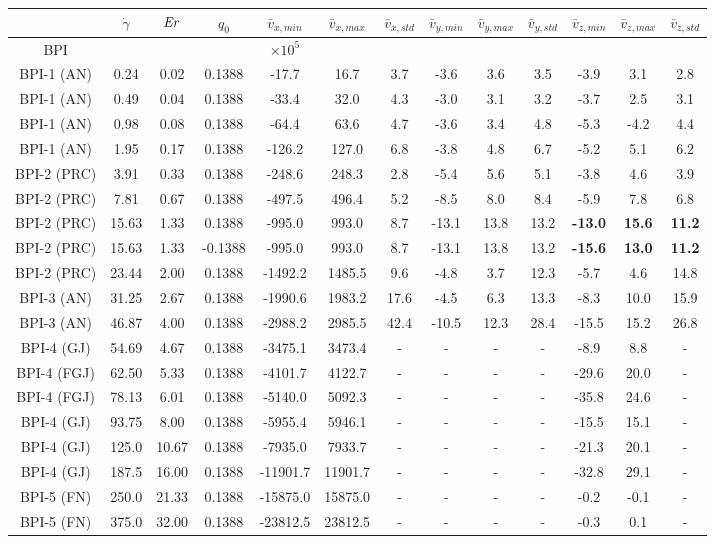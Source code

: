 \documentclass[8.5pt,twoside,twocolumn]{article}
\begin{document}
\begin{table}[htpb]
\begin{tabular}{|c||c|| c || c || c |c |c||c| c| c||c| c| c|}
\hline
& $\dot{\gamma}$ & ${\it Er}$ & $q_0$ & $\bar{v}_{x,min}$ & $\bar{v}_{x,max}$ & $\bar{v}_{x,std}$ & $\bar{v}_{y,min}$ & $\bar{v}_{y,max}$ & $\bar{v}_{y,std}$ & $\bar{v}_{z,min}$ & $\bar{v}_{z,max}$ & $\bar{v}_{z,std}$ \\
\hline
BPI & & & & $\times 10^5$\\
\hline
BPI-1 (AN) &0.24 &0.02 & 0.1388 &-17.7 &16.7 &3.7 &-3.6 &3.6 &3.5 &-3.9 &3.1 &2.8 \\
BPI-1 (AN) &0.49 &0.04 & 0.1388 &-33.4 &32.0 &4.3 &-3.0 &3.1 &3.2 &-3.7 &2.5 &3.1 \\
BPI-1 (AN) &0.98 &0.08 & 0.1388 &-64.4 &63.6 &4.7 &-3.6 &3.4 &4.8 &-5.3 &-4.2 &4.4 \\
BPI-1 (AN) &1.95 &0.17 & 0.1388 &-126.2 &127.0 &6.8 &-3.8 &4.8 &6.7 &-5.2 &5.1 &6.2 \\
\hline
BPI-2 (PRC) &3.91 &0.33 & 0.1388 &-248.6 &248.3 &2.8 &-5.4 &5.6 &5.1 &-3.8 &4.6 &3.9 \\
BPI-2 (PRC) &7.81 &0.67 & 0.1388 &-497.5 &496.4 &5.2 &-8.5 &8.0 &8.4 &-5.9 &7.8 &6.8 \\
BPI-2 (PRC) &15.63 &1.33 & 0.1388 &-995.0 &993.0 &8.7 &-13.1 &13.8 &13.2 &\bf{-13.0} &\bf{15.6} &\bf{11.2} \\
BPI-2 (PRC) &15.63 &1.33 & -0.1388 &-995.0 &993.0 &8.7 &-13.1 &13.8 &13.2 &\bf{-15.6} &\bf{13.0} &\bf{11.2} \\
BPI-2 (PRC) &23.44 &2.00 & 0.1388 &-1492.2 &1485.5 &9.6 &-4.8 &3.7 &12.3 &-5.7 &4.6 &14.8 \\
\hline
BPI-3 (AN) &31.25 &2.67 & 0.1388 &-1990.6 &1983.2 &17.6 &-4.5 &6.3 &13.3 &-8.3 &10.0 &15.9 \\
BPI-3 (AN) &46.87 &4.00 & 0.1388 &-2988.2 &2985.5 &42.4 &-10.5 &12.3 &28.4 &-15.5 &15.2 &26.8 \\
\hline
BPI-4 (GJ) &54.69 &4.67 & 0.1388 &-3475.1 &3473.4 &- &- &- &- &-8.9 &8.8 &- \\
BPI-4 (FGJ) &62.50 &5.33 & 0.1388 &-4101.7 &4122.7 &- &- &- &- &-29.6 &20.0 &- \\
BPI-4 (FGJ) &78.13 &6.01 & 0.1388 &-5140.0 &5092.3 &- &- &- &- &-35.8 &24.6 &- \\
BPI-4 (GJ) &93.75 &8.00 & 0.1388 &-5955.4 &5946.1 &-  &- &- &- &-15.5 &15.1 &- \\
BPI-4 (GJ) &125.0 &10.67 & 0.1388 &-7935.0 &7933.7 &- &- &- &- &-21.3 &20.1 &- \\
BPI-4 (GJ) &187.5 &16.00 & 0.1388 &-11901.7 &11901.7 &- &- &- &- &-32.8 &29.1 &- \\
\hline
BPI-5 (FN) & 250.0 &21.33 & 0.1388 &-15875.0 &15875.0 &- &- &- &- &-0.2 &-0.1 &- \\
BPI-5 (FN) & 375.0 &32.00 & 0.1388 &-23812.5 &23812.5 &- &- &- &- &-0.3 &0.1 &- \\
\hline


\end{tabular}
\end{table}
\end{document}
